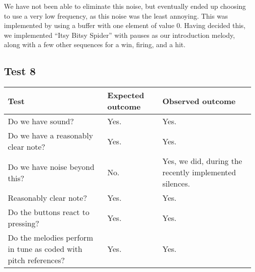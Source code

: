 We have not been able to eliminate this noise, but eventually ended up
choosing to use a very low frequency, as this noise was the least
annoying. This was implemented by using a buffer with one element of
value 0. Having decided this, we implemented ``Itsy Bitsy Spider'' with
pauses as our introduction melody, along with a few other sequences for
a win, firing, and a hit.

\subsection*{Test 8}
\begin{center}
\begin{tabular}{|p{3.6cm}|p{3.6cm}|p{3.6cm}|}
\hline
{\sc Test} & {\sc Expected outcome} & {\sc Observed outcome}\\ \hline
Do we have sound? & Yes. & Yes. \\ \hline
Do we have a reasonably clear note? & Yes. & Yes. \\ \hline
Do we have noise beyond this? & No. & Yes, we did, during the recently implemented silences. \\ \hline
Reasonably clear note? & Yes. & Yes. \\ \hline
Do the buttons react to pressing? & Yes. & Yes. \\ \hline
Do the melodies perform in tune as coded with pitch references? & Yes. &
Yes. \\ \hline
\end{tabular}
\end{center}
